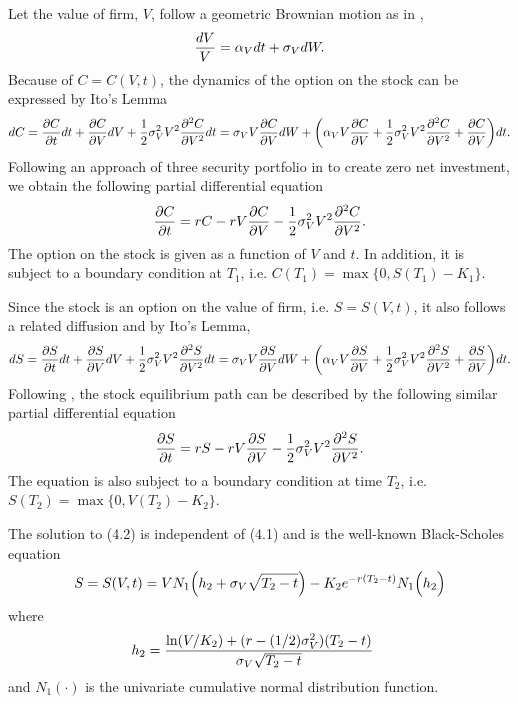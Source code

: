 \documentclass[11pt,letter]{article}
\def\a{\alpha} \def\b{\beta} \def\g{\gamma} \def\d{\delta} \def\r{\rho}
\theoremstyle{definition}
\theoremstyle{remark}
\numberwithin{equation}{section}
\begin{document}
Let the value of firm, $V$, follow a geometric Brownian motion as in \cite{black1973pricing},
\begin{align*}
    \frac{dV}{V}=\a_Vdt+\s_VdW.
\end{align*}
Because of $C=C(V,t)$, the dynamics of the option on the stock can be expressed by Ito's Lemma
\begin{align*}
    dC=\frac{\partial C}{\partial t}dt+\frac{\partial C}{\partial V}dV+\frac{1}{2}\s_V^2V^2\frac{\partial^2C}{\partial V^2}dt=\s_VV\frac{\partial C}{\partial V}dW+\bigg(\a_VV\frac{\partial C}{\partial V}+\frac{1}{2}\s_V^2V^2\frac{\partial^2C}{\partial V^2}+\frac{\partial C}{\partial V}\bigg)dt.
\end{align*}
Following an approach of three security portfolio in \cite{merton1973theory} to create zero net investment, we obtain the following partial differential equation
\begin{align}
    \frac{\partial C}{\partial t}=rC-rV\frac{\partial C}{\partial V}-\frac{1}{2}\sigma_V^2V^2\frac{\partial^2C}{\partial V^2}.
\end{align}
The option on the stock is given as a function of $V$ and $t$. In addition, it is subject to a boundary condition at $T_1$, i.e. $C(T_1)=\max\{0,S(T_1)-K_1\}$.

Since the stock is an option on the value of firm, i.e. $S=S(V,t)$, it also follows a related diffusion and by Ito's Lemma,
\begin{align*}
    dS=\frac{\partial S}{\partial t}dt+\frac{\partial S}{\partial V}dV+\frac{1}{2}\s_V^2V^2\frac{\partial^2S}{\partial V^2}dt=\s_VV\frac{\partial S}{\partial V}dW+\bigg(\a_VV\frac{\partial S}{\partial V}+\frac{1}{2}\s_V^2V^2\frac{\partial^2S}{\partial V^2}+\frac{\partial S}{\partial V}\bigg)dt.
\end{align*}
Following \cite{merton1973theory}, the stock equilibrium path can be described by the following similar partial differential equation
\begin{align}
    \frac{\partial S}{\partial t}=rS-rV\frac{\partial S}{\partial V}-\frac{1}{2}\sigma_V^2V^2\frac{\partial^2S}{\partial V^2}.
\end{align}
The equation is also subject to a boundary condition at time $T_2$, i.e. $S(T_2)=\max\{0,V(T_2)-K_2\}$.

The solution to (4.2) is independent of (4.1) and is the well-known Black-Scholes equation
\begin{align}
    S=S(V,t)=VN_1\Big(h_2+\sigma_V\sqrt{T_2-t}\Big)-K_2e^{-r(T_2-t)}N_1\Big(h_2\Big)
\end{align}
where
\begin{align*}
    h_2&=\frac{\ln(V/K_2)+(r-(1/2)\sigma_V^2)(T_2-t)}{\sigma_V\sqrt{T_2-t}}
\end{align*}
and $N_1(\cdot)$ is the univariate cumulative normal distribution function.
\end{document}
